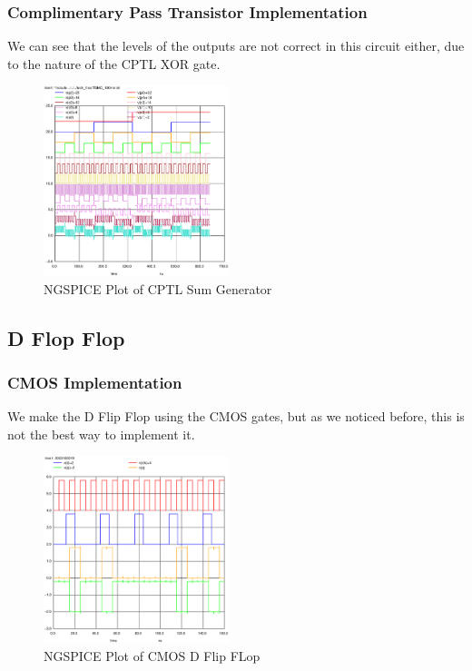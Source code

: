 \documentclass[conference]{IEEEtran}
\begin{document}
\subsubsection{Complimentary Pass Transistor Implementation}

We can see that the levels of the outputs are not correct in this circuit either, due to the nature of the CPTL XOR gate.

\begin{figure}[H]
    \centering
    \includegraphics[width=0.48\textwidth]{images/sum_gen_optimized_tran.eps}
    \caption{NGSPICE Plot of CPTL Sum Generator}
\end{figure}

\subsection{D Flop Flop}

\subsubsection{CMOS Implementation}

We make the D Flip Flop using the CMOS gates, but as we noticed before, this is not the best way to implement it.

\begin{figure}[H]
    \centering
    \includegraphics[width=0.48\textwidth]{images/d_ff_cmos_tran.eps}
    \caption{NGSPICE Plot of CMOS D Flip FLop}
\end{figure}
\end{document}
